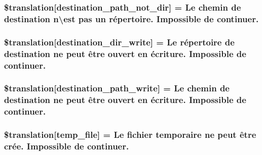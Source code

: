 \subsubsection[{\$translation}]{\setlength{\rightskip}{0pt plus 5cm}\$translation\mbox{[}\textquotesingle{}destination\+\_\+path\+\_\+not\+\_\+dir\textquotesingle{}\mbox{]} = \textquotesingle{}Le chemin de destination n\textbackslash{}\textquotesingle{}est pas un répertoire. Impossible de continuer.\textquotesingle{}}\label{class_8upload_8fr___f_r_8php_a5704a67137126e8c87b7a364175929d4}
\hypertarget{class_8upload_8fr___f_r_8php_a97608ea194a616db49141a0e6dee900c}{}
\subsubsection[{\$translation}]{\setlength{\rightskip}{0pt plus 5cm}\$translation\mbox{[}\textquotesingle{}destination\+\_\+dir\+\_\+write\textquotesingle{}\mbox{]} = \textquotesingle{}Le répertoire de destination ne peut être ouvert en écriture. Impossible de continuer.\textquotesingle{}}\label{class_8upload_8fr___f_r_8php_a97608ea194a616db49141a0e6dee900c}
\hypertarget{class_8upload_8fr___f_r_8php_a40e4e1962226b89fd76da5819a9602b0}{}
\subsubsection[{\$translation}]{\setlength{\rightskip}{0pt plus 5cm}\$translation\mbox{[}\textquotesingle{}destination\+\_\+path\+\_\+write\textquotesingle{}\mbox{]} = \textquotesingle{}Le chemin de destination ne peut être ouvert en écriture. Impossible de continuer.\textquotesingle{}}\label{class_8upload_8fr___f_r_8php_a40e4e1962226b89fd76da5819a9602b0}
\hypertarget{class_8upload_8fr___f_r_8php_a2baece8da11e20d45175db91851ec3e3}{}
\subsubsection[{\$translation}]{\setlength{\rightskip}{0pt plus 5cm}\$translation\mbox{[}\textquotesingle{}temp\+\_\+file\textquotesingle{}\mbox{]} = \textquotesingle{}Le fichier temporaire ne peut être crée. Impossible de continuer.\textquotesingle{}}\label{class_8upload_8fr___f_r_8php_a2baece8da11e20d45175db91851ec3e3}
\hypertarget{class_8upload_8fr___f_r_8php_a922967ca2df0efdd455261142d8e5715}{}
